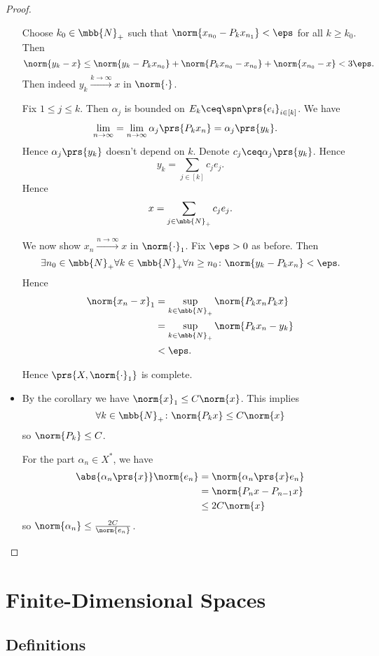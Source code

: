 \documentclass[10pt, twoside]{book}
\begin{document}
\begin{proof}
\begin{itemize}
Choose $k_0 \in \mbb{N}_+$ such that $\norm{x_{n_0} - P_k x_{n_1}} < \eps$ for all $k \geq k_0$. Then
\[\norm{y_k - x} \leq \norm{y_k - P_k x_{n_0}} + \norm{P_k x_{n_0} - x_{n_0}} + \norm{x_{n_0} - x} < 3\eps \text{.}\]
Then indeed $y_k \xrightarrow{k \to \infty} x$ in $\norm{\cdot}$.

Fix $1 \leq j \leq k$. Then $\alpha_j$ is bounded on $E_k \ceq \spn\prs{e_i}_{i \in [k]}$.
We have
\begin{align*}
\lim_{n\to\infty} &= \lim_{n \to \infty} \alpha_j \prs{P_k x_n}
=
\alpha_j\prs{y_k} \text{.}
\end{align*}
Hence $\alpha_j\prs{y_k}$ doesn't depend on $k$. Denote $c_j \ceq \alpha_j\prs{y_k}$. Hence
\[y_k = \sum_{j\in[k]} c_j e_j \text{.}\]
Hence
\[x = \sum_{j \in \mbb{N}_+} c_j e_j \text{.}\]

We now show $x_n \xrightarrow{n\to\infty} x$ in $\norm{\cdot}_1$. Fix $\eps > 0$ as before. Then
\[\exists n_0 \in \mbb{N}_+ \forall k \in \mbb{N}_+ \forall n \geq n_0 \colon \norm{y_k - P_k x_n} < \eps \text{.}\]
Hence
\begin{align*}
\norm{x_n - x}_1 &= \sup_{k \in \mbb{N}_+} \norm{P_k x_n P_k x}
\\&= \sup_{k \in \mbb{N}_+} \norm{P_k x_n - y_k}
\\&< \eps \text{.}
\end{align*}

Hence $\prs{X, \norm{\cdot}_1}$ is complete.

\item By the corollary %
we have $\norm{x}_1 \leq C \norm{x}$.
This implies
\[\forall k \in \mbb{N}_+ \colon \norm{P_k x} \leq C \norm{x}\]
so
$\norm{P_k} \leq C$.

For the part $\alpha_n \in X^*$, we have
\begin{align*}
\abs{\alpha_n\prs{x}} \norm{e_n} &=
\norm{\alpha_n\prs{x} e_n}
\\&=
\norm{P_n x - P_{n-1} x}
\\&\leq
2 C \norm{x}
\end{align*}
so $\norm{\alpha_n} \leq \frac{2 C}{\norm{e_n}}$.
\end{itemize}
\end{proof}

\section{Finite-Dimensional Spaces}

\subsection{Definitions}
\end{document}
